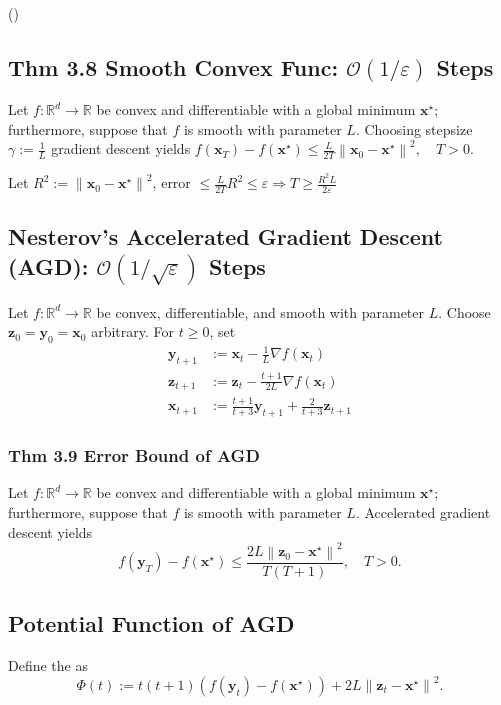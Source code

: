 ()



\subsection*{Thm 3.8 Smooth Convex Func: $\mathcal{O}(1 / \varepsilon)$ Steps}
Let $f: \mathbb{R}^{d} \rightarrow \mathbb{R}$ be convex and differentiable with a global minimum $\mathbf{x}^{\star}$; furthermore, suppose that $f$ is smooth with parameter $L$. Choosing stepsize $\gamma:=\frac{1}{L}$ gradient descent yields $
f\left(\mathbf{x}_{T}\right)-f\left(\mathbf{x}^{\star}\right) \leq \frac{L}{2 T}\left\|\mathbf{x}_{0}-\mathbf{x}^{\star}\right\|^{2}, \quad T>0
$.

Let $R^{2}:=\left\|\mathbf{x}_{0}-\mathbf{x}^{\star}\right\|^{2}$, error $\leq \frac{L}{2 T} R^{2} \leq \varepsilon \Rightarrow T \geq \frac{R^{2} L}{2 \varepsilon} $ 




\subsection*{Nesterov's Accelerated Gradient Descent (AGD): $\mathcal{O}(1 / \sqrt{\varepsilon})$ Steps}
Let $f: \mathbb{R}^{d} \rightarrow \mathbb{R}$ be convex, differentiable, and smooth with parameter $L$. Choose $\mathbf{z}_{0}=\mathbf{y}_{0}=\mathbf{x}_{0}$ arbitrary. For $t \geq 0$, set
$$
\begin{aligned}
\mathbf{y}_{t+1} &:=\mathbf{x}_{t}-\frac{1}{L} \nabla f\left(\mathbf{x}_{t}\right) \\
\mathbf{z}_{t+1} &:=\mathbf{z}_{t}-\frac{t+1}{2 L} \nabla f\left(\mathbf{x}_{t}\right) \\
\mathbf{x}_{t+1} &:=\frac{t+1}{t+3} \mathbf{y}_{t+1}+\frac{2}{t+3} \mathbf{z}_{t+1}
\end{aligned}
$$
\subsubsection*{Thm 3.9 Error Bound of AGD}
Let $f: \mathbb{R}^{d} \rightarrow \mathbb{R}$ be convex and differentiable with a global minimum $\mathbf{x}^{\star} ;$ furthermore, suppose that $f$ is smooth with parameter $L$. Accelerated gradient descent yields
$$
f\left(\mathbf{y}_{T}\right)-f\left(\mathbf{x}^{\star}\right) \leq \frac{2 L\left\|\mathbf{z}_{0}-\mathbf{x}^{\star}\right\|^{2}}{T(T+1)}, \quad T>0 .
$$


\subsection*{Potential Function of AGD}
Define the  as
$$
\Phi(t):=t(t+1)\left(f\left(\mathbf{y}_{t}\right)-f\left(\mathbf{x}^{\star}\right)\right)+2 L\left\|\mathbf{z}_{t}-\mathbf{x}^{\star}\right\|^{2} .
$$

